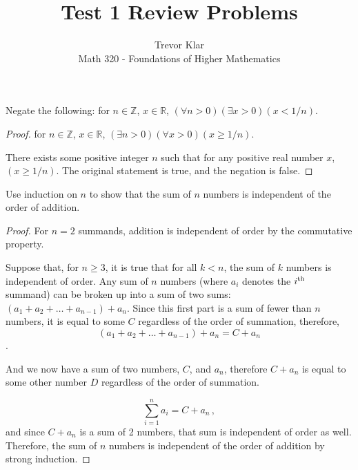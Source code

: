\documentclass[10pt,letterpaper]{article}
\author{Trevor Klar\\
Math 320 - Foundations of Higher Mathematics}
\title{Test 1 Review Problems}
\newcommand{\Z}{\mathbb{Z}}
\newcommand{\R}{\mathbb{R}}
\newcommand{\ts}{\textsuperscript}
\newenvironment{problem}[2][Problem]{\begin{trivlist}
\item[\hskip \labelsep {\bfseries #1}\hskip \labelsep {\bfseries #2.}]}{\end{trivlist}}
\begin{document}
\maketitle

\begin{problem}{2.21}
Negate the following: for $n \in \Z$, $x \in \R$, $(\forall n >0) (\exists x > 0)(x<1/n)$. 
\end{problem}
\begin{proof}
for $n \in \Z$, $x \in \R$, $(\exists n > 0)(\forall x >0 ) (x \geq 1/n)$.

There exists some positive integer $n$ such that for any positive real number $x$, $(x \geq 1/n)$. The original statement is true, and the negation is false. 
\end{proof}

\begin{problem}{3.42}
Use induction on $n$ to show that the sum of $n$ numbers is independent of the order of addition. 
\end{problem}

\begin{proof}
For $n=2$ summands, addition is independent of order by the commutative property.

Suppose that, for  $n \geq 3$, it is true that for all $k<n$, the sum of $k$ numbers is independent of order. Any sum of $n$ numbers (where $a_i$ denotes the $i\ts{th}$ summand) can be broken up into a sum of two sums: $(a_1 + a_2 + \ldots +a_{n-1}) + a_n$. Since this first part is a sum of fewer than $n$ numbers, it is equal to some $C$ regardless of the order of summation, therefore, $$(a_1 + a_2 + \ldots +a_{n-1}) + a_n = C + a_n$$.

And we now have a sum of two numbers, $C$, and $a_n$, therefore $C + a_n$ is equal to some other number $D$ regardless of the order of summation. 

$$\sum_{i=1}^n a_i = C + a_n\,, $$ and since $C + a_n$ is a sum of 2 numbers, that sum is independent of order as well. Therefore, the sum of $n$ numbers is independent of the order of addition by strong induction. 
\end{proof}

\begin{problem}{}

\end{problem}
\end{document}
